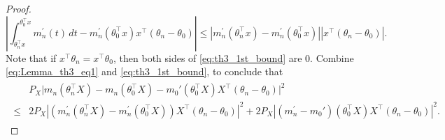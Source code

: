 \begin{proof}
\begin{equation}\label{eq:th3_1st_bound}
\left|\int_{\theta_n^\top x}^{\theta_0^\top x} m_n^{\prime}(t)\,dt - m_n^{\prime}(\theta_0^{\top}x)x^{\top}(\theta_n - \theta_0)\right| \le |m_n^{\prime}(\theta_n^{\top}x)- m_n^{\prime}(\theta_0^{\top}x)| |x^\top (\theta_n-\theta_0)|.
\end{equation} Note that if $x^\top\theta_n=x^\top\theta_0$, then both sides of \eqref{eq:th3_1st_bound} are $0.$
%
%
%
%
%
Combine \eqref{eq:Lemma_th3_eq1} and \eqref{eq:th3_1st_bound}, to conclude that
\begin{align}\label{eq:split_rate}
 \begin{split}
&P_X\big|m_n(\theta_n^{\top}X) - m_n(\theta_0^{\top}X) - m_0'(\theta_0^{\top}X)X^{\top}(\theta_n - \theta_0)\big|^2\\
 \le{}& 2 P_X\left|(m_n^{\prime}(\theta_n^{\top}X)- m_n^{\prime}(\theta_0^{\top}X)) X^{\top}(\theta_n - \theta_0)\right|^2+ 2 P_X\left| (m_n^{\prime}- m_0')(\theta_0^{\top}X)X^{\top}(\theta_n - \theta_0)\right|^2.
 \end{split}
 \end{align} 

\end{proof}
